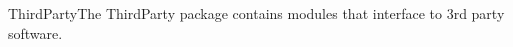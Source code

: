 \begin{ahpackage}{ThirdParty}{The ThirdParty package contains modules that 
interface to 3rd party software.}

\end{ahpackage}
